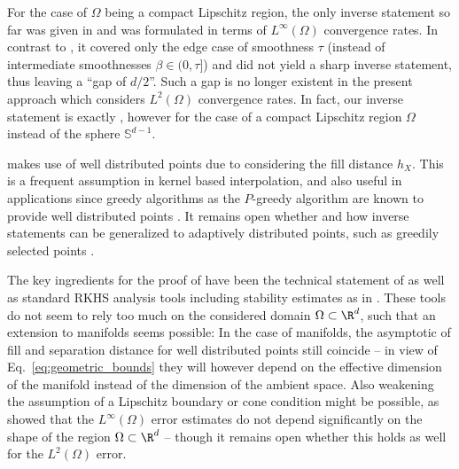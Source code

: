 \documentclass[a4paper, 10pt]{article}
\begin{document}
For the case of $\Omega$ being a compact Lipschitz region, 
the only inverse statement so far was given in \cite{schaback2002inverse} and was formulated in terms of $L^\infty(\Omega)$ convergence rates.
In contrast to , 
it covered only the edge case of smoothness $\tau$ (instead of intermediate smoothnesses $\beta \in (0, \tau]$) and did not yield a sharp inverse statement, thus leaving a ``gap of $d/2$''.
Such a gap is no longer existent in the present approach which considers $L^2(\Omega)$ convergence rates.
In fact, our inverse statement  is exactly \cite[Theorem 6.2]{narcowich2007direct},
however for the case of a compact Lipschitz region $\Omega$ instead of the sphere $\mathbb{S}^{d-1}$. 

 makes use of well distributed points due to considering the fill distance $h_{X}$.
This is a frequent assumption in kernel based interpolation, 
and also useful in applications since greedy algorithms as the $P$-greedy algorithm are known to provide well distributed points \cite[Theorem 19 \& 20]{wenzel2021novel}.
It remains open whether and how inverse statements can be generalized to adaptively distributed points, 
such as greedily selected points \cite{wenzel2023analysis, santin2023optimality}.

The key ingredients for the proof of  have been the technical statement of  as well as standard RKHS analysis tools including stability estimates as in .
These tools do not seem to rely too much on the considered domain $\Omega \subset \R^d$, such that an extension to manifolds seems possible: 
In the case of manifolds, the asymptotic of fill and separation distance for well distributed points still coincide 
-- in view of Eq.~\eqref{eq:geometric_bounds} they will however depend on the effective dimension of the manifold instead of the dimension of the ambient space.
%
Also weakening the assumption of a Lipschitz boundary or cone condition might be possible, 
as \cite{wenzel2024stability} showed that the $L^\infty(\Omega)$ error estimates do not depend significantly on the shape of the region $\Omega \subset \R^d$ 
-- though it remains open whether this holds as well for the $L^2(\Omega)$ error.

%
%
%
%
%
%
%
%
%
%
%
%
%
%
\end{document}
